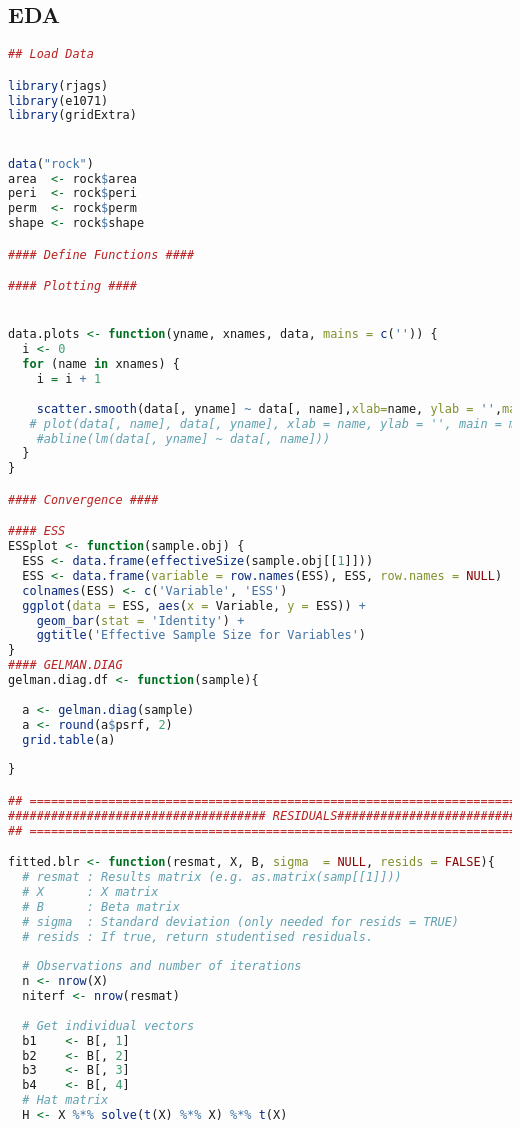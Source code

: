 \documentclass{article}
\begin{document}
\subsection{EDA} \label{appA3a}
\begin{lstlisting}[language=R]
## Load Data

library(rjags)
library(e1071)
library(gridExtra)


data("rock")
area  <- rock$area
peri  <- rock$peri
perm  <- rock$perm
shape <- rock$shape

#### Define Functions ####

#### Plotting ####


data.plots <- function(yname, xnames, data, mains = c('')) {
  i <- 0
  for (name in xnames) {
    i = i + 1
    
    scatter.smooth(data[, yname] ~ data[, name],xlab=name, ylab = '',main=mains[i])
   # plot(data[, name], data[, yname], xlab = name, ylab = '', main = mains[i])
    #abline(lm(data[, yname] ~ data[, name]))
  }
}

#### Convergence ####

#### ESS
ESSplot <- function(sample.obj) {
  ESS <- data.frame(effectiveSize(sample.obj[[1]]))
  ESS <- data.frame(variable = row.names(ESS), ESS, row.names = NULL)
  colnames(ESS) <- c('Variable', 'ESS')
  ggplot(data = ESS, aes(x = Variable, y = ESS)) +
    geom_bar(stat = 'Identity') +
    ggtitle('Effective Sample Size for Variables')
}
#### GELMAN.DIAG
gelman.diag.df <- function(sample){
  
  a <- gelman.diag(sample)
  a <- round(a$psrf, 2)
  grid.table(a)
  
}

## ===========================================================================##
#################################### RESIDUALS##################################
## ===========================================================================##

fitted.blr <- function(resmat, X, B, sigma  = NULL, resids = FALSE){
  # resmat : Results matrix (e.g. as.matrix(samp[[1]]))
  # X      : X matrix
  # B      : Beta matrix
  # sigma  : Standard deviation (only needed for resids = TRUE)
  # resids : If true, return studentised residuals. 
  
  # Observations and number of iterations
  n <- nrow(X)
  niterf <- nrow(resmat)
  
  # Get individual vectors
  b1    <- B[, 1]
  b2    <- B[, 2]
  b3    <- B[, 3]
  b4    <- B[, 4]
  # Hat matrix
  H <- X %*% solve(t(X) %*% X) %*% t(X)
  

\end{lstlisting}
\end{document}
